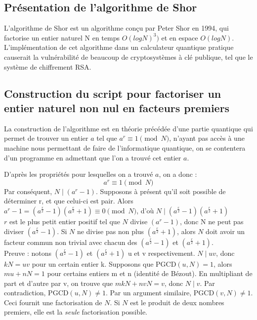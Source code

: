 \documentclass[12pt]{article}
\begin{document}
\subsection{Présentation de l'algorithme de Shor}
L'algorithme de Shor est un algorithme conçu par Peter Shor en 1994, qui factorise un entier naturel N en temps $O(log N)^3)$ et en espace $O(log N)$.
L'implémentation de cet algorithme dans un calculateur quantique pratique causerait la vulnérabilité de beaucoup de cryptosystèmes à clé publique, tel que le système de chiffrement RSA.

\subsection{Construction du script pour factoriser un entier naturel non nul en facteurs premiers}
La construction de l'algorithme est en théorie précédée d'une partie quantique qui permet de trouver un entier $a$ tel que $a^r \equiv 1 \pmod N$, n'ayant pas accès à une machine nous permettant de faire de l'informatique quantique, on se contentera d'un programme en admettant que l'on a trouvé cet entier $a$.

D'après les propriétés pour lesquelles on a trouvé $a$, on a donc :
$$a^r \equiv 1 \pmod N$$
Par conséquent, $N \mid (a^r -1)$. Supposons à présent qu'il soit possible de déterminer r, et que celui-ci est pair. Alors
\\
$a^r -1 = (a^{\frac{r}{2}} -1)(a^{\frac{r}{2}}+1) \equiv 0 \pmod N$, d'où $N \mid (a^{\frac{r}{2}} -1)(a^{\frac{r}{2}}+1)$
\\
$r$ est le plus petit entier positif tel que $N$ divise $(a^r -1)$, donc N ne peut pas diviser $(a^{\frac{r}{2}}-1)$. Si $N$ ne divise pas non plus $(a^{\frac{r}{2}}+1)$, alors $N$ doit avoir un facteur commun non trivial avec chacun des $(a^{\frac{r}{2}}-1)$ et $(a^{\frac{r}{2}}+1)$.
\\
Preuve : notons $(a^{\frac{r}{2}}-1)$ et $(a^{\frac{r}{2}}+1)$ u et v respectivement. $N \mid uv$, donc $kN=uv$ pour un certain entier k. Supposons que PGCD$(u, N)=1$, alors $mu +nN=1$ pour certains entiers m et n (identité de Bézout). En multipliant de part et d'autre par v, on trouve que $mkN + nvN=v$, donc $N \mid v$. Par contradiction, PGCD$(u, N)\neq 1$. Par un argument similaire, PGCD$(v, N) \neq 1$.
\\
Ceci fournit une factorisation de $N$. Si $N$ est le produit de deux nombres premiers, elle est la \textit{seule} factorisation possible.
\end{document}
